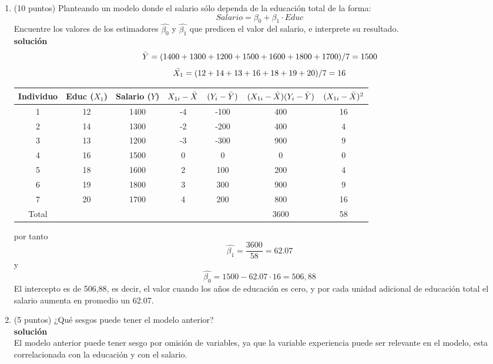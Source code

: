 \documentclass[10pt,a4paper]{article}
\begin{document}
\begin{enumerate}
\begin{enumerate}
    \item (10 puntos) Planteando un modelo donde el salario sólo dependa de la educación total de la forma:
    $$Salario = \beta_0 + \beta_1 \cdot Educ$$
    Encuentre los valores de los estimadores $\hat{\beta_0}$ y $\hat{\beta_1}$ que predicen el valor del salario, e interprete su resultado.
    \\
    \textbf{solución}
    \\
    $$\Bar{Y}=(1400+1300+1200+1500+1600+1800+1700)/7 = 1500$$
    $$\Bar{X_1} = (12+14+13+16+18+19+20)/7 = 16$$
\begin{center}
\begin{tabular}{|c|c|c|c|c|c|c|}
\hline
\textbf{Individuo} & \textbf{Educ} ($X_1$)  & \textbf{Salario ($Y$)} & $X_{1i}-\Bar{X}$ & $(Y_i - \Bar{Y})$ & $(X_{1i}-\Bar{X})(Y_i - \Bar{Y})$ & $(X_{1i}-\Bar{X})^2$\\
\hline
1 & 12 & 1400 & -4 & -100 & 400    & 16  \\
2 & 14 & 1300 & -2 & -200 & 400    & 4 \\
3 & 13 & 1200 & -3 & -300 & 900    & 9 \\
4 & 16 & 1500 & 0  & 0    &  0     & 0  \\
5 & 18 & 1600 & 2  & 100  & 200    & 4  \\
6 & 19 & 1800 & 3  & 300  & 900    & 9  \\
7 & 20 & 1700 & 4  & 200  & 800    & 16\\
\hline
Total & & & & & 3600  & 58 \\
\end{tabular}
\end{center}
por tanto 
$$\hat{\beta_1} = \frac{3600}{58}= 62.07$$
y
$$\hat{\beta_0} = 1500-62.07\cdot 16 = 506,88$$
El intercepto es de 506,88, es decir, el valor cuando los años de educación es cero, y por cada unidad adicional de educación total el salario aumenta en promedio un 62.07.

    \item (5 puntos) ¿Qué sesgos puede tener el modelo anterior?
    \\
    \textbf{solución}
    \\
    El modelo anterior puede tener sesgo por omisión de variables, ya que la variable experiencia puede ser relevante en el modelo, esta correlacionada con la educación y con el salario.
    \\


\end{enumerate}
\end{enumerate}
\end{document}
